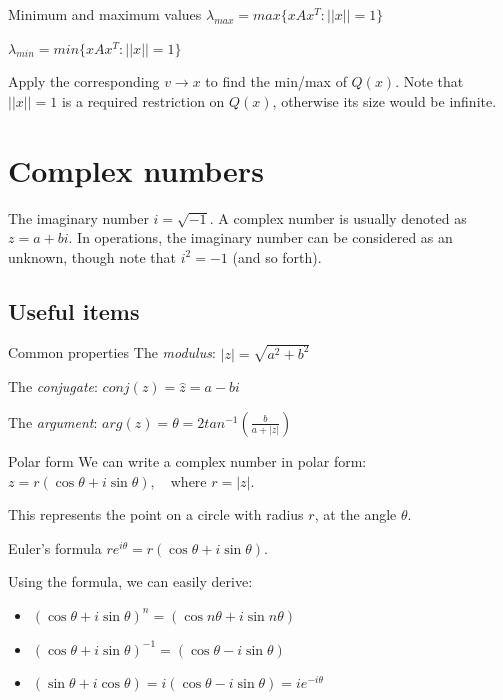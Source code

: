 \documentclass{article}
\begin{document}
\begin{definition}[]{Minimum and maximum values}
    $\lambda_{max} = max\{xAx^T:||x||=1\}$

    $\lambda_{min} = min\{xAx^T:||x||=1\}$

    Apply the corresponding $v\rightarrow x$ to find the min/max of $Q(x)$. Note that $||x||=1$ is a required restriction on $Q(x)$, otherwise its size would be infinite.
\end{definition}


\section{Complex numbers}
The imaginary number $i=\sqrt{-1}$. A complex number is usually denoted as $z=a+bi$. In operations, the imaginary number can be considered as an unknown, though note that $i^2=-1$ (and so forth).
\subsection{Useful items}
\begin{definition}[]{Common properties}
    The \emph{modulus}: $|z|=\sqrt{a^2+b^2}$

    The \emph{conjugate}: $conj(z) = \hat{z} = a-bi$

    The \emph{argument}: $arg(z) = \theta = 2tan^{-1}(\frac{b}{a+|z|})$
\end{definition}

\begin{knBox}[]{Polar form}
    We can write a complex number in polar form: $z=r(\cos\theta+i\sin\theta),\quad \text{where } r=|z|$.

    This represents the point on a circle with radius $r$, at the angle $\theta$.
\end{knBox}

\begin{knBox}[]{Euler's formula}
    $re^{i\theta}=r(\cos\theta+i\sin\theta)$.

    Using the formula, we can easily derive:
    \begin{itemize}
        \item $(\cos\theta+i\sin\theta)^n = (\cos{n\theta}+i\sin{n\theta})$
        \item $(\cos\theta+i\sin\theta)^{-1} = (\cos{\theta}-i\sin{\theta})$
        \item $(\sin\theta+i\cos\theta) = i(\cos{\theta}-i\sin{\theta})=ie^{-i\theta}$
    \end{itemize}
\end{knBox}
\end{document}
